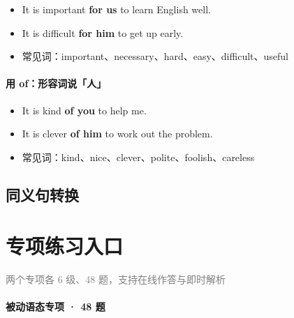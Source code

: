 \documentclass[11pt,a4paper]{ctexart}
\begin{document}
\begin{itemize}[leftmargin=1.4em]
\item It is important \textbf{for us} to learn English well.
\item It is difficult \textbf{for him} to get up early.
\item 常见词：important、necessary、hard、easy、difficult、useful
\end{itemize}

\paragraph{用 of：形容词说「人」}

\begin{itemize}[leftmargin=1.4em]
\item It is kind \textbf{of you} to help me.
\item It is clever \textbf{of him} to work out the problem.
\item 常见词：kind、nice、clever、polite、foolish、careless
\end{itemize}

\begin{center}\end{center}

\subsection*{同义句转换}

\begin{center}\end{center}

\section{专项练习入口}
\noindent\textcolor{gray}{两个专项各 6 级、48 题，支持在线作答与即时解析}\par\smallskip
\paragraph{被动语态专项 · 48 题}
\end{document}
